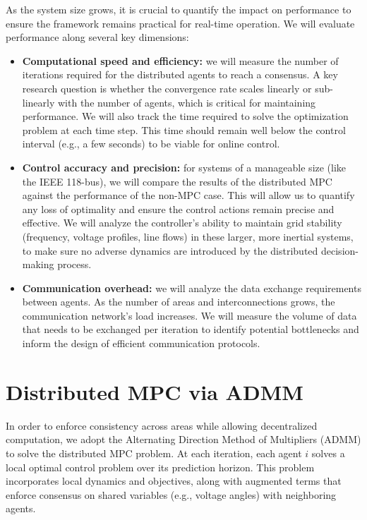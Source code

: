 \documentclass{article}
\begin{document}
As the system size grows, it is crucial to quantify the impact on performance to ensure the framework remains practical for real-time operation. We will evaluate performance along several key dimensions:

\begin{itemize}
    \item \textbf{Computational speed and efficiency:} we will measure the number of iterations required for the distributed agents to reach a consensus. A key research question is whether the convergence rate scales linearly or sub-linearly with the number of agents, which is critical for maintaining performance. We will also track the time required to solve the optimization problem at each time step. This time should remain well below the control interval (e.g., a few seconds) to be viable for online control.

    \item \textbf{Control accuracy and precision:} for systems of a manageable size (like the IEEE 118-bus), we will compare the results of the distributed MPC against the performance of the non-MPC case. This will allow us to quantify any loss of optimality and ensure the control actions remain precise and effective. We will analyze the controller's ability to maintain grid stability (frequency, voltage profiles, line flows) in these larger, more inertial systems, to make sure no adverse dynamics are introduced by the distributed decision-making process.

    \item \textbf{Communication overhead:} we will analyze the data exchange requirements between agents. As the number of areas and interconnections grows, the communication network's load increases. We will measure the volume of data that needs to be exchanged per iteration to identify potential bottlenecks and inform the design of efficient communication protocols.
\end{itemize}
\appendix
\newpage
\section{Distributed MPC via ADMM}

In order to enforce consistency across areas while allowing decentralized computation, we adopt the Alternating Direction Method of Multipliers (ADMM) to solve the distributed MPC problem. At each iteration, each agent $i$ solves a local optimal control problem over its prediction horizon. This problem incorporates local dynamics and objectives, along with augmented terms that enforce consensus on shared variables (e.g., voltage angles) with neighboring agents.
\end{document}

